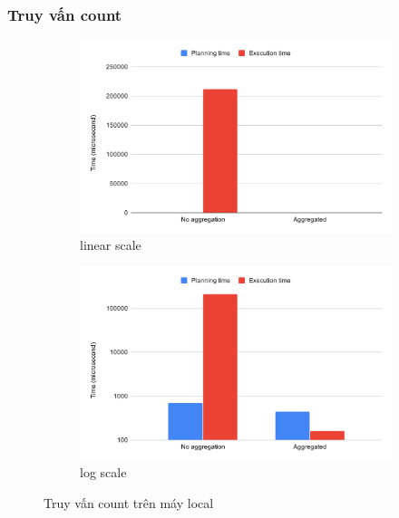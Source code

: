\subsubsection{Truy vấn count}
\begin{figure}[H]
\centering
\begin{subfigure}{0.5\textwidth}
    \centering
    \includegraphics[width=\textwidth]{images/testing/count-local.png}
    \caption{linear scale}
\end{subfigure}%
\begin{subfigure}{0.5\textwidth}
    \centering
    \includegraphics[width=\textwidth]{images/testing/count-local-log.png}
    \caption{log scale}
\end{subfigure}
\caption{Truy vấn count trên máy local}
\end{figure}

